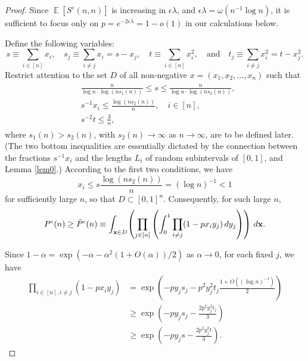 \documentclass[11pt]{amsart}
\newcommand{\E}{\operatorname{\mathbb{E}}}
\def\eps{\varepsilon}
\theoremstyle{remark}
\numberwithin{equation}{section}
\begin{document}
\begin{proof}
Since $\E[S^{\eps}(n,n)]$ is increasing in $\epsilon\lambda$, and $\epsilon\lambda=\omega(n^{-1}\log n)$, it is sufficient to focus only on $p=e^{-2\epsilon\lambda}=1-o(1)$ in our calculations below.

Define the following variables:
\begin{equation*}
    s \equiv \sum_{i \in [n]}x_i,\quad s_j \equiv \sum_{i\neq j}x_i=s-x_j, \quad t \equiv \sum_{i \in [n]}x_i^2 , \quad \text{and} \quad t_j\equiv \sum_{i\neq j}x_i^2=t-x_j^2.
\end{equation*}
Restrict attention to the set $D$ of all non-negative $x=(x_1,x_2,\ldots,x_n)$ such that
\begin{align}
\label{set_D}
\begin{split}
&\frac{n}{\log n\cdot\log(ns_1(n))}  \leq s \leq \frac{n}{\log n\cdot\log(ns_2(n))}, \\
&s^{-1} x_i \leq \frac{\log(ns_2(n))}{n},\quad i \in [n],\\
&s^{-2} t \leq \frac{3}{n},
\end{split}
\end{align}
where $s_1(n)>s_2(n)$, with $s_2(n) \to \infty$ as $n \to \infty$, are to be defined later. (The two bottom inequalities are essentially dictated by the connection between the fractions $s^{-1}x_i$ and the lengths $L_i$ of random subintervals 
of $[0,1]$, and Lemma \ref{lem0}.) According to the first two conditions, we have
\begin{equation*}
    x_i \leq s \frac{\log(ns_2(n))}{n} = (\log n)^{-1}<1
\end{equation*}
for sufficiently large $n$, so that $D \subset [0,1]^n$. Consequently, for such large $n$,
\begin{equation*}
P^\epsilon(n)\geq \tilde{P}^\epsilon(n) \equiv  \int_{\bold x \in D}\!\left(\prod_{j \in [n]}\left(\int_0^1 \prod_{i \neq j} (1-px_iy_j)\,dy_j\right)\right)\,d\bold x.
\end{equation*}

Since $1-\alpha=\exp(-\alpha-\alpha^2(1+O(\alpha))/2)$ as $\alpha \to 0$, for each fixed $j$, we have
\begin{align*}
    \prod_{i \in[n], i\neq j} \left(1-px_iy_j\right) 
    &= \exp\left(-py_js_j-p^2y^2_jt_j\frac{1+O\left((\log n)^{-1}\right)}{2}\right)\\
    &\geq \exp\left(-py_js_j-\frac{2p^2y^2_jt_j}{3}\right)\\
    &\geq \exp\left(-py_js-\frac{2p^2y^2_jt}{3}\right).
\end{align*}


\end{proof}
\end{document}
